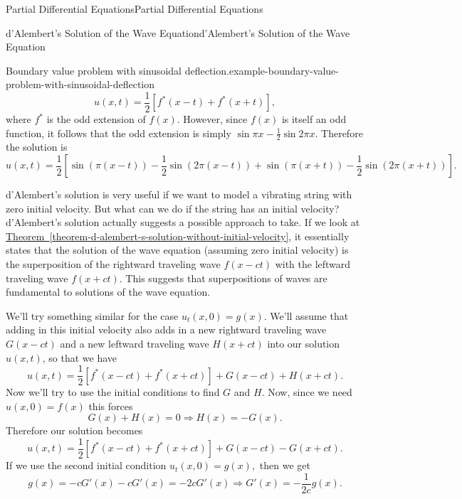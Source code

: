 \documentclass[10pt,]{book}
\numberwithin{equation}{section}
\begin{document}
\begin{chapterptx}{Partial Differential Equations}{}{Partial Differential Equations}{}{}
\begin{sectionptx}{d'Alembert's Solution of the Wave Equation}{}{d'Alembert's Solution of the Wave Equation}{}{}
\begin{example}{Boundary value problem with sinusoidal deflection.}{example-boundary-value-problem-with-sinusoidal-deflection}
\begin{equation*}
u(x,t) = \frac{1}{2}[f^{*}(x-t)+f^{*}(x+t)],
\end{equation*}
\hypertarget{p-493}{}%
where \(f^{*}\) is the odd extension of \(f(x)\). However, since \(f(x)\) is itself an odd function, it follows that the odd extension is simply \(\sin\pi x-\frac{1}{2}\sin2\pi x\). Therefore the solution is%
%
\begin{equation*}
u(x,t) = \frac{1}{2}\left[\sin(\pi(x-t))-\frac{1}{2}\sin(2\pi(x-t)) + \sin(\pi(x+t)) - \frac{1}{2}\sin(2\pi(x+t))\right].
\end{equation*}
\end{example}
\hypertarget{p-494}{}%
d'Alembert's solution is very useful if we want to model a vibrating string with zero initial velocity. But what can we do if the string has an initial velocity? d'Alembert's solution actually suggests a possible approach to take. If we look at \hyperref[theorem-d-alembert-s-solution-without-initial-velocity]{Theorem~\ref{theorem-d-alembert-s-solution-without-initial-velocity}}, it essentially states that the solution of the wave equation (assuming zero initial velocity) is the superposition of the rightward traveling wave \(f(x-ct)\) with the leftward traveling wave \(f(x+ct)\). This suggests that superpositions of waves are fundamental to solutions of the wave equation.%
\par
\hypertarget{p-495}{}%
We'll try something similar for the case \(u_{t}(x,0) = g(x)\). We'll assume that adding in this initial velocity also adds in a new rightward traveling wave \(G(x-ct)\) and a new leftward traveling wave \(H(x+ct)\) into our solution \(u(x,t)\), so that we have%
%
\begin{equation*}
u(x,t) = \frac{1}{2}[f^{*}(x-ct)+f^{*}(x+ct)] + G(x-ct) + H(x+ct).
\end{equation*}
\hypertarget{p-496}{}%
Now we'll try to use the initial conditions to find \(G\) and \(H\). Now, since we need \(u(x,0) = f(x)\) this forces%
%
\begin{equation*}
G(x) + H(x) = 0\Rightarrow H(x) = -G(x).
\end{equation*}
\hypertarget{p-497}{}%
Therefore our solution becomes%
%
\begin{equation*}
u(x,t) = \frac{1}{2}[f^{*}(x-ct)+f^{*}(x+ct)] + G(x-ct) - G(x+ct).
\end{equation*}
If we use the second initial condition \(u_{t}(x,0) = g(x),\) then we get%
\begin{equation*}
g(x) = -cG'(x) - cG'(x) = -2cG'(x) \Rightarrow G'(x) = -\frac{1}{2c}g(x).
\end{equation*}

\end{sectionptx}
\end{chapterptx}
\end{document}
